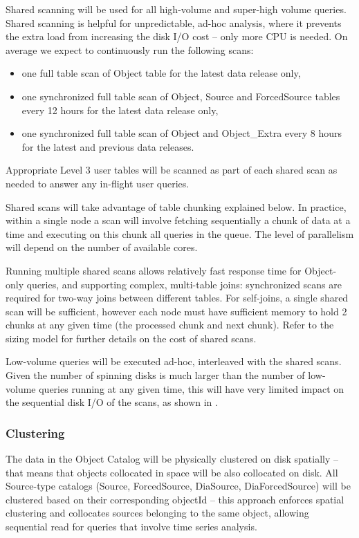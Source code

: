 \documentclass[DM,toc]{lsstdoc}
\begin{document}
Shared scanning will be used for all high-volume and super-high volume
queries. Shared scanning is helpful for unpredictable, ad-hoc analysis,
where it prevents the extra load from increasing the disk I/O cost --
only more CPU is needed. On average we expect to continuously run the
following scans:

\begin{itemize}
\item
  one full table scan of Object table for the latest data release only,
\item
  one synchronized full table scan of Object, Source and ForcedSource
  tables every 12 hours for the latest data release only,
\item
  one synchronized full table scan of Object and Object\_Extra every 8
  hours for the latest and previous data releases.
\end{itemize}

Appropriate Level 3 user tables will be scanned as part of each shared
scan as needed to answer any in-flight user queries.

Shared scans will take advantage of table chunking explained below. In
practice, within a single node a scan will involve fetching sequentially
a chunk of data at a time and executing on this chunk all queries in the
queue. The level of parallelism will depend on the number of available
cores.

Running multiple shared scans allows relatively fast response time for
Object-only queries, and supporting complex, multi-table joins:
synchronized scans are required for two-way joins between different
tables. For self-joins, a single shared scan will be sufficient,
however each node must have sufficient memory to hold 2 chunks at any
given time (the processed chunk and next chunk). Refer to the sizing
model  for further details on the cost of shared scans.

Low-volume queries will be executed ad-hoc, interleaved with the shared
scans. Given the number of spinning disks is much larger than the number
of low-volume queries running at any given time, this will have very
limited impact on the sequential disk I/O of the scans, as shown in
.

\subsubsection{Clustering}\label{clustering}

The data in the Object Catalog will be physically clustered on disk
spatially -- that means that objects collocated in space will be also
collocated on disk. All Source-type catalogs (Source, ForcedSource,
DiaSource, DiaForcedSource) will be clustered based on their
corresponding objectId -- this approach enforces spatial clustering and
collocates sources belonging to the same object, allowing sequential
read for queries that involve time series analysis.
\end{document}
